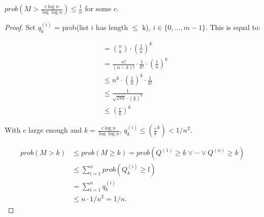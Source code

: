 \begin{mylemma}
${prob}(M> \frac{c \log n}{\log \log n}) \le \frac{1}{n}$ for some $c$.
\end{mylemma}
\begin{proof}
Set $q_k^{(i)}$ = prob(list $i$ has length $\le$ k), $i \in \{0, \ldots, m-1\}$.
This is equal to:

\begin{align*}
&= {n \choose k} \cdot \left(\frac{1}{n}\right)^k \\
& = \frac{n!}{(n-k)!} \cdot \frac{1}{k!} \cdot \left(\frac{1}{n}\right)^k \\
& \le n^k \cdot \left ( \frac{1}{n} \right ) ^ k \cdot \frac{1}{k!} \\
&\le \frac{1}{\sqrt{2 \pi k} \cdot \left ( \frac{k}{e} \right )^k} \\
&\le \left ( \frac{e}{k} \right )^k
\end{align*}

With $c$ large enough and $k = \frac{c \log n}{\log \log n}$, $q_k^{(i)} \le \left (\frac{e}{k}^k \right ) < 1/n^2$.

\begin{align*}
{prob}(M > k) & \le {prob} (M \ge k) = {prob} (Q^{(1)} \ge k \vee \cdots \vee Q^{(n)} \ge k) \\
& \le \sum\limits_{i=1}^n {prob}(Q^{(i)}_k \ge l) \\
& = \sum\limits_{i=1}^n q^{(i)}_k \\
& \le n \cdot 1/n^2 = 1/n.
\end{align*}


\end{proof}


